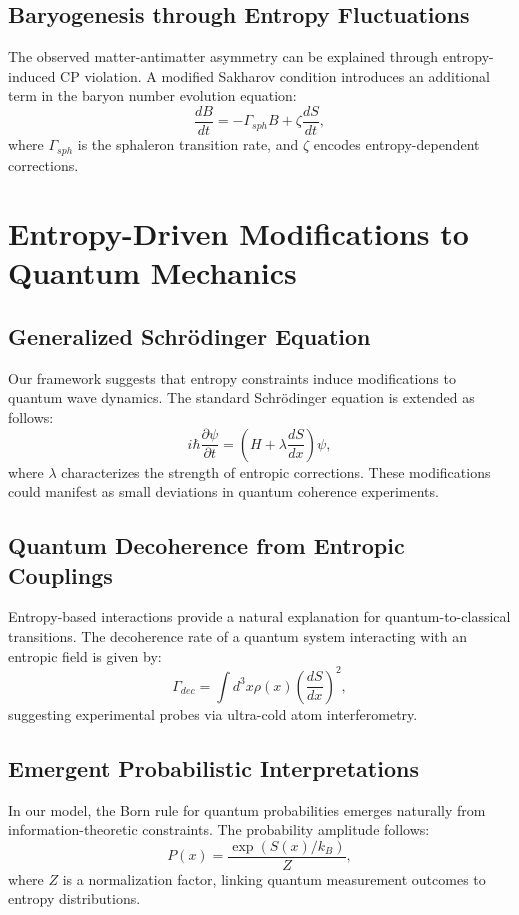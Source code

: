\documentclass{article}
\begin{document}
\subsection{Baryogenesis through Entropy Fluctuations}
The observed matter-antimatter asymmetry can be explained through entropy-induced CP violation. A modified Sakharov condition introduces an additional term in the baryon number evolution equation:
\begin{equation}
\frac{dB}{dt} = -\Gamma_{sph} B + \zeta \frac{dS}{dt},
\end{equation}
where $\Gamma_{sph}$ is the sphaleron transition rate, and $\zeta$ encodes entropy-dependent corrections.

\section{Entropy-Driven Modifications to Quantum Mechanics}

\subsection{Generalized Schrödinger Equation}
Our framework suggests that entropy constraints induce modifications to quantum wave dynamics. The standard Schrödinger equation is extended as follows:
\begin{equation}
i\hbar \frac{\partial \psi}{\partial t} = \left( H + \lambda \frac{dS}{dx} \right) \psi,
\end{equation}
where $\lambda$ characterizes the strength of entropic corrections. These modifications could manifest as small deviations in quantum coherence experiments.

\subsection{Quantum Decoherence from Entropic Couplings}
Entropy-based interactions provide a natural explanation for quantum-to-classical transitions. The decoherence rate of a quantum system interacting with an entropic field is given by:
\begin{equation}
\Gamma_{dec} = \int d^3x \rho(x) \left( \frac{dS}{dx} \right)^2,
\end{equation}
suggesting experimental probes via ultra-cold atom interferometry.

\subsection{Emergent Probabilistic Interpretations}
In our model, the Born rule for quantum probabilities emerges naturally from information-theoretic constraints. The probability amplitude follows:
\begin{equation}
P(x) = \frac{\exp(S(x)/k_B)}{Z},
\end{equation}
where $Z$ is a normalization factor, linking quantum measurement outcomes to entropy distributions.
\end{document}
